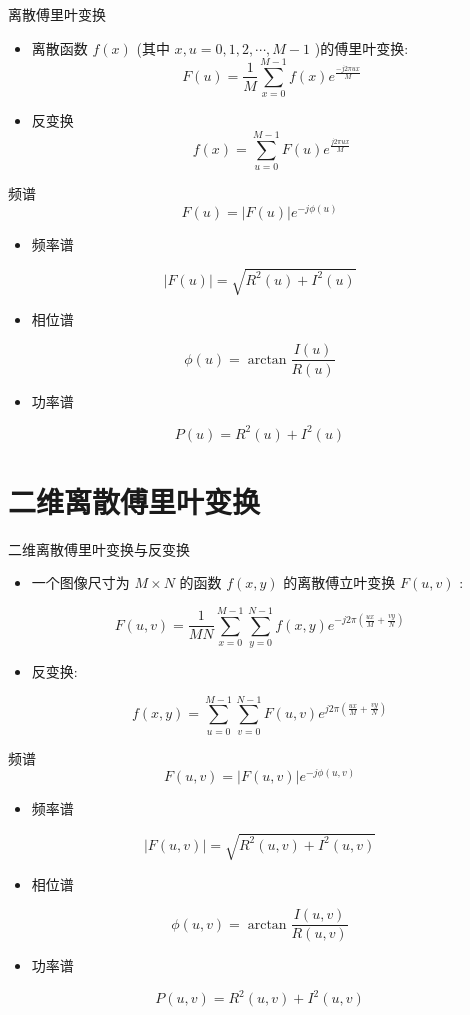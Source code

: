 \documentclass[presentation]{beamer}
\begin{document}
\begin{frame}[label={sec:org039ed86}]{离散傅里叶变换}
\begin{itemize}
\item 离散函数 \(f(x)\) (其中 \(x,u=0,1,2,\cdots,M-1\) )的傅里叶变换:
\[ F(u) = \frac{1}{M}\sum_{x=0}^{M-1}f(x)e^{\frac{-j2\pi u x}{M}}\]
\item 反变换
\[ f(x) = \sum_{u=0}^{M-1}F(u)e^{\frac{j2\pi u x}{M}}\]
\end{itemize}
\end{frame}

\begin{frame}[label={sec:orgf10547c}]{频谱}
\[ F(u) = |F(u)|e^{-j\phi(u)} \]
\begin{itemize}
\item 频率谱
\end{itemize}
\[ |F(u)| =\sqrt{R^2(u)+I^2(u)} \]
\begin{itemize}
\item 相位谱
\end{itemize}
\[ \phi(u) = \arctan\frac{I(u)}{R(u)} \]
\begin{itemize}
\item 功率谱
\end{itemize}
\[ P(u) =R^2(u)+I^2(u) \]
\end{frame}

\section{二维离散傅里叶变换}
\label{sec:orga42749e}
\begin{frame}[label={sec:org9e71865}]{二维离散傅里叶变换与反变换}
\begin{itemize}
\item 一个图像尺寸为 \(M\times N\) 的函数 \(f(x,y)\) 的离散傅立叶变换 \(F(u,v)\) :
\end{itemize}
\[ F(u,v) =\frac{1}{MN}\sum_{x=0}^{M-1}\sum_{y=0}^{N-1}f(x,y)e^{-j2\pi(\frac{ux}{M}+\frac{vy}{N})}\]
\begin{itemize}
\item 反变换:
\end{itemize}
\[ f(x,y) =\sum_{u=0}^{M-1}\sum_{v=0}^{N-1}F(u,v)e^{j2\pi(\frac{ux}{M}+\frac{vy}{N})}\]
\end{frame}
\begin{frame}[label={sec:org7cb6c3e}]{频谱}
\[ F(u,v) = |F(u,v)|e^{-j\phi(u,v)} \]
\begin{itemize}
\item 频率谱
\end{itemize}
\[ |F(u,v)| =\sqrt{R^2(u,v)+I^2(u,v)} \]
\begin{itemize}
\item 相位谱
\end{itemize}
\[ \phi(u,v) = \arctan\frac{I(u,v)}{R(u,v)} \]
\begin{itemize}
\item 功率谱
\end{itemize}
\[ P(u,v) =R^2(u,v)+I^2(u,v) \]
\end{frame}
\end{document}
